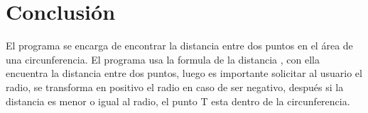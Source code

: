 \documentclass{IEEEcsmag}
\begin{document}
\section{Conclusión}
El programa se encarga de encontrar la distancia entre dos puntos en el área de una circunferencia. El programa usa la formula de la distancia , con ella encuentra la distancia entre dos puntos, luego es importante solicitar al usuario el radio, se transforma en positivo el radio en caso de ser negativo, después si la distancia es menor o igual al  radio, el punto T esta dentro de la circunferencia.
   
\end{document}
